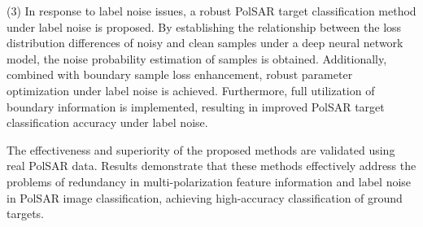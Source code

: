 \begin{englishabstract}
    (3) In response to label noise issues, a robust PolSAR target classification method under label noise is proposed. By establishing the relationship between the loss distribution differences of noisy and clean samples under a deep neural network model, the noise probability estimation of samples is obtained. Additionally, combined with boundary sample loss enhancement, robust parameter optimization under label noise is achieved. Furthermore, full utilization of boundary information is implemented, resulting in improved PolSAR target classification accuracy under label noise.

    The effectiveness and superiority of the proposed methods are validated using real PolSAR data. Results demonstrate that these methods effectively address the problems of redundancy in multi-polarization feature information and label noise in PolSAR image classification, achieving high-accuracy classification of ground targets.

\end{englishabstract}



